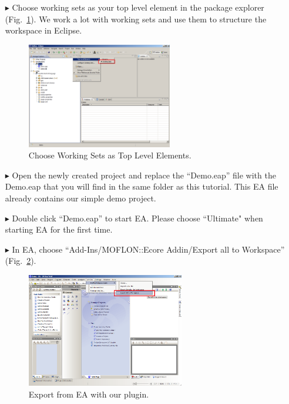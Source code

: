 \begin{enumerate}
\item[$\blacktriangleright$] Choose working sets as your top level element in
the package explorer (Fig.~\ref{fig_eclipseWorkingsets}).
We work a lot with working sets and use them to structure the workspace in
Eclipse.
\begin{figure}[!h]
	\centering
  \includegraphics[width=0.6\textwidth]{pics/eclipse_workingsets.png}
	\caption{Choose Working Sets as Top Level Elements.}
	\label{fig_eclipseWorkingsets}
\end{figure}

\item[$\blacktriangleright$] Open the newly created project and replace the
``Demo.eap'' file with the Demo.eap that you will find in the
same folder as this tutorial. 
This EA file already contains our simple demo project.

\item[$\blacktriangleright$] Double click ``Demo.eap'' to start EA.
Please choose ``Ultimate" when starting EA for the first time.

\item[$\blacktriangleright$] In EA, choose ``Add-Ins/MOFLON::Ecore Addin/Export
all to Workspace'' (Fig.~\ref{fig_ea}).
\begin{figure}[!h]
	\centering
  \includegraphics[width=0.65\textwidth]{pics/ea_firststart.png}
	\caption{Export from EA with our plugin.}
	\label{fig_ea}
\end{figure}


\end{enumerate}
